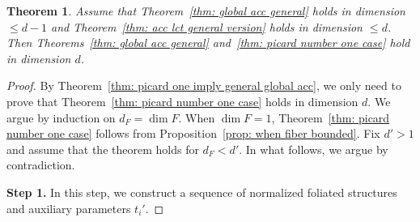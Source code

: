 \documentclass[11pt,reqno]{amsart}
\numberwithin{equation}{section}
\newtheorem{thm}{Theorem}[section]
\theoremstyle{definition}
\begin{document}
\begin{thm}\label{thm: acc to global acc}
Assume that Theorem~\ref{thm: global acc general} holds in dimension $\leq d-1$ and Theorem~\ref{thm: acc lct general version} holds in dimension $\leq d$. Then Theorems~\ref{thm: global acc general} and~\ref{thm: picard number one case} hold in dimension $d$.
\end{thm}
\begin{proof}
By Theorem~\ref{thm: picard one imply general global acc}, we only need to prove that Theorem~\ref{thm: picard number one case} holds in dimension $d$. We argue by induction on $d_F = \dim F$. When $\dim F=1$, Theorem~\ref{thm: picard number one case} follows from Proposition~\ref{prop: when fiber bounded}. Fix $d'>1$ and assume that the theorem holds for $d_F<d'$. In what follows, we argue by contradiction.



\medskip

\noindent\textbf{Step 1.} In this step, we construct a sequence of normalized foliated structures and auxiliary parameters $t_i'$.


\end{proof}
\end{document}
